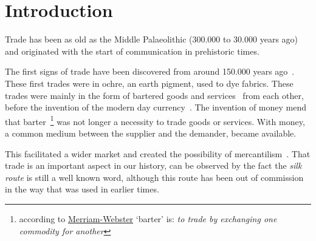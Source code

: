 \chapter{Introduction}

Trade has been as old as the Middle Palaeolithic (300.000 to 30.000 years ago) and originated with the start of communication in prehistoric times. 

The first signs of trade have been discovered from around 150.000 years ago~\citep{Miller:2006,Watson:2005,Fernandez-Armesto:2003,Mayell:2003,Henahan:2002}. 
These first trades were in ochre, an earth pigment, used to dye fabrics. 
These trades were mainly in the form of bartered goods and services~\citep{OSullivan:2003} from each other, before the invention of the modern day currency~\citep{Watson:2005}. 
The invention of money mend that barter~\footnote{according to \href{http://www.merriam-webster.com}{Merriam-Webster} `barter' is: \emph{to trade by exchanging one commodity for another}} was not longer a necessity to trade goods or services. 
With money, a common medium between the supplier and the demander, became available. 

This facilitated a wider market and created the possibility of mercantilism~\citep{Heckscher:1936}. 
That trade is an important aspect in our history, can be observed by the fact the \textit{silk route} is still a well known word, although this route has been out of commission in the way that was used in earlier times.

